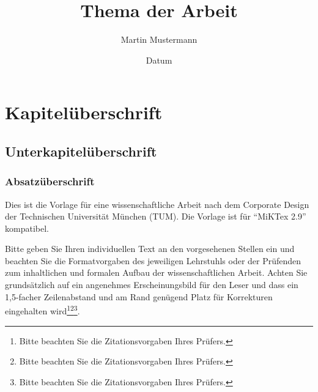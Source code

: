 %
% 
% 
%


\renewcommand{\Thema}{%
    Thema der Arbeit (optional)}




\title{Thema der Arbeit}
\author{Martin Mustermann}
\date{Datum}


\tableofcontents %

\chapter{Kapitelüberschrift}

\section{Unterkapitelüberschrift}

\subsection[]{Absatzüberschrift}

Dies ist die Vorlage für eine wissenschaftliche Arbeit nach dem Corporate
Design der Technischen Universität München (TUM). Die Vorlage ist für "`MiKTex 2.9"' kompatibel.

Bitte geben Sie Ihren individuellen Text an den vorgesehenen Stellen ein und
beachten Sie die Formatvorgaben des jeweiligen Lehrstuhls oder der Prüfenden
zum inhaltlichen und formalen Aufbau der wissenschaftlichen Arbeit. Achten Sie
grundsätzlich auf ein angenehmes Erscheinungsbild für den Leser und dass ein
1,5-facher Zeilenabstand und am Rand genügend Platz für Korrekturen
eingehalten wird\footnote{Bitte beachten Sie die Zitationsvorgaben Ihres
Prüfers.}\footnote{Bitte beachten Sie die Zitationsvorgaben Ihres
Prüfers.}\footnote{Bitte beachten Sie die Zitationsvorgaben Ihres
Prüfers.}.

